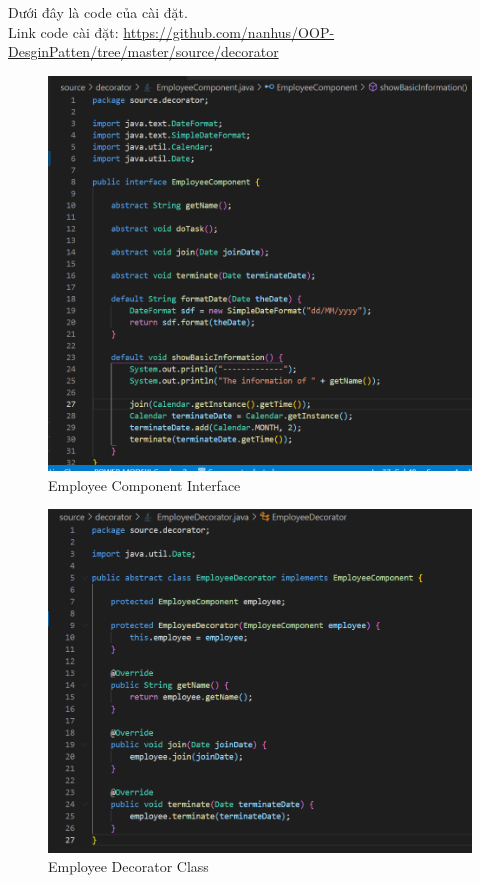Dưới đây là code của cài đặt.\\
Link code cài đặt: \url{https://github.com/nanhus/OOP-DesginPatten/tree/master/source/decorator}
\newpage
\begin{figure}[!htb]
    \centering
    \includegraphics[width=\textwidth]{fig/Decorator/employee_component_interface.png}
    \caption{Employee Component Interface}
    \label{fig:employee_component_interface}
\end{figure}
\newpage
\begin{figure}[!htb]
    \centering
    \includegraphics[width=\textwidth]{fig/Decorator/employee_decorator_class.png}
    \caption{Employee Decorator Class}
    \label{fig:employee_decorator_class}
\end{figure}
